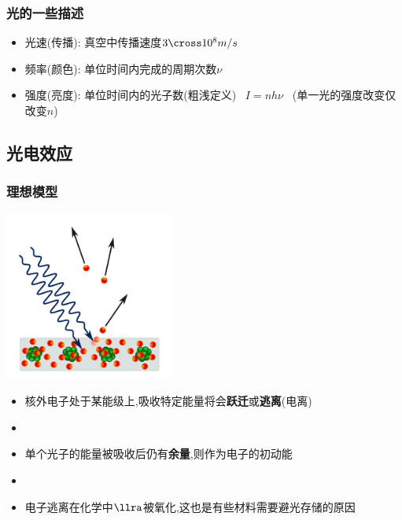 \documentclass{article}
\begin{document}
\vspace{2em}

\subsubsection{光的一些描述}
\begin{itemize}
    \item 光速(传播): 真空中传播速度$3 \cross 10^{8}m/s $
    \item 频率(颜色): 单位时间内完成的周期次数$\nu$
    \item 强度(亮度): 单位时间内的光子数(粗浅定义) \, $I = nh\nu$ \, (单一光的强度改变仅改变$n$)
\end{itemize}

\vspace{2em}

\subsection{光电效应}
\subsubsection{理想模型}

\begin{minipage}{0.5\textwidth}
    \includegraphics[width=15em,keepaspectratio]{./pictures/9.png}
\end{minipage}
\hspace{-5em}
\begin{minipage}{0.5\textwidth}
    \begin{itemize}
        \item 核外电子处于某能级上,吸收特定能量将会\textbf{跃迁}或\textbf{逃离}(电离)
        \item[]
        \item 单个光子的能量被吸收后仍有\textbf{余量},则作为电子的初动能
        \item[]
        \item 电子逃离在化学中$\llra$被氧化,这也是有些材料需要避光存储的原因
    \end{itemize}
\end{minipage}
\end{document}
